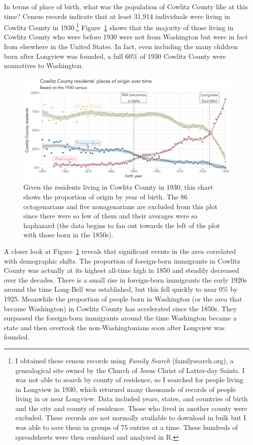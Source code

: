 In terms of place of birth, what was the population of Cowlitz County like at this time? Census records indicate that at least 31,914 individuals were living in Cowlitz County in 1930.\footnote{I obtained these census records using \textit{Family Search} (familysearch.org), a genealogical site owned by the Church of Jesus Christ of Latter-day Saints. I was not able to search by county of residence, so I searched for people living in Longview in 1930, which returned many thousands of records of people living in or near Longview. Data included years, states, and countries of birth and the city and county of residence. Those who lived in another county were excluded. These records are not normally available to download in bulk but I was able to save them in groups of 75 entries at a time. These hundreds of spreadsheets were then combined and analyzed in R.} Figure~\ref{fig:census1930} shows that the majority of those living in Cowlitz County who were before 1930 were not from Washington but were in fact from elsewhere in the United States. In fact, even including the many children born after Longview was founded, a full 60\% of 1930 Cowlitz County were nonnatives to Washington.

\begin{figure}[t!]
    \centering
    \includegraphics[width = 6.5in]{Figures/other_figures/origin_1930.pdf}
    \caption[Proportion of Cowlitz County residents by year of birth by origin ]{Given the residents living in Cowlitz County in 1930, this chart shows the proportion of origin by year of birth. The 86 octogenarians and five nonagenarians are excluded from this plot since there were so few of them and their averages were so haphazard (the data begins to fan out towards the left of the plot with those born in the 1850s).}
    \label{fig:census1930}
\end{figure}

A closer look at Figure~\ref{fig:census1930} reveals that significant events in the area correlated with demographic shifts. The proportion of foreign-born immigrants in Cowlitz County was actually at its highest all-time high in 1850 and steadily decreased over the decades. There is a small rise in foreign-born immigrants the early 1920s around the time Long-Bell was established, but this fell quickly to near 0\% by 1925. Meanwhile the proportion of people born in Washington (or the area that became Washington) in Cowlitz County has accelerated since the 1850s. They surpassed the foreign-born immigrants around the time Washington became a state and then overtook the non-Washingtonians soon after Longview was founded.

